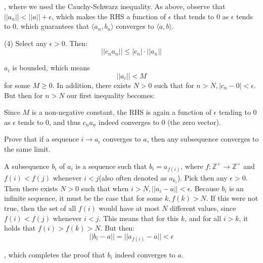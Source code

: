 \begin{solution}
    , where we used the Cauchy-Schwarz inequality. As above, observe that $\lvert \lvert a_n \rvert \rvert < \lvert \lvert a \rvert \rvert + \epsilon$, which makes the RHS a function of $\epsilon$ that tends to 0 as $\epsilon$ tends to 0, which guarantees that $\langle a_n, b_n \rangle$ converges to $\langle a, b \rangle$.

    (4) Select any $\epsilon > 0$. Then:
    $$\lvert \lvert c_n a_n \rvert \rvert \leq \lvert c_n \rvert \cdot \lvert \lvert a_n \rvert \rvert$$

    $a_i$ is bounded, which means $$\lvert \lvert a_i \rvert \rvert < M$$ for some $M \geq 0$. In addition, there exists $N > 0$ such that for $n > N, \lvert c_n - 0 \rvert < \epsilon$. But then for $n > N$ our first inequality becomes:

    Since $M$ is a non-negative constant, the RHS is again a function of $\epsilon$ tending to 0 as $\epsilon$ tends to 0, and thus $c_na_n$ indeed converges to 0 (the zero vector).
\end{solution}

\begin{exercise}{18}
    Prove that if a sequence $i \rightarrow a_i$ converges to $a$, then any subsequence converges to the same limit.
\end{exercise}

\begin{solution}

    A subsequence $b_i$ of $a_i$ is a sequence such that $b_i = a_{f(i)}$, where $f: \mathbb{Z}^+ \rightarrow \mathbb{Z}^+$ and $f(i) < f(j)$ whenever $i < j$(also often denoted as $a_{k_i}$). Pick then any $\epsilon > 0$. Then there exists $N > 0$ such that when $i > N, \lvert \lvert a_i - a \rvert \rvert < \epsilon$. Because $b_i$ is an infinite sequence, it must be the case that for some $k, f(k) > N$. If this were not true, then the set of all $f(i)$ would have at most $N$ different values, since $f(i) < f(j)$ whenever $i < j$. This means that for this $k$, and for all $i > k$, it holds that $f(i) > f(k) > N$. But then:
    $$\lvert \lvert b_i - a \rvert \rvert = \lvert \lvert a_{f(i)} - a \rvert \rvert < \epsilon$$

    , which completes the proof that $b_i$ indeed converges to $a$.
\end{solution}

